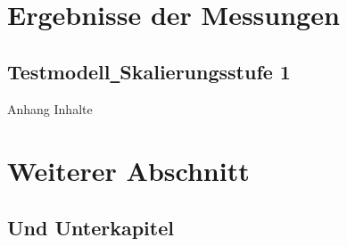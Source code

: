 
\section{Ergebnisse der Messungen}
\label{measurementResults}
\subsection{Testmodell\texttt{\_}Skalierungsstufe 1}

Anhang Inhalte

\section{Weiterer Abschnitt}
\label{anotherSection}
\subsection{Und Unterkapitel}
